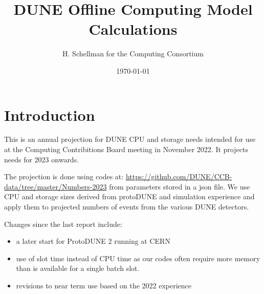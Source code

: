 \documentclass[12pt,landscape]{article}
\title{DUNE Offline Computing Model Calculations}
\author{H. Schellman for the Computing Consortium}
\date{\today}
\begin{document}
\makeatletter
{}
\makeatother
\newcommand{\csvautotabularright}[2][]{\csvloop{autotabularright={#2},#1}}

\maketitle
\section{Introduction}

This is an annual projection for DUNE CPU and storage needs intended for use at the Computing Contribitions Board meeting in November 2022. It projects needs for 2023 onwards. 

The projection is done using codes at: \href{https://github.com/DUNE/CCB-data/tree/master/Numbers-2023}{https://github.com/DUNE/CCB-data/tree/master/Numbers-2023} from parameters stored in a json file. We use CPU and storage sizes derived from protoDUNE and simulation experience and apply them to projected numbers of events from the various DUNE detectors. 

Changes since the last report include:

\begin{itemize}
\item a later start for ProtoDUNE 2 running at CERN
\item use of slot time instead of CPU time as our codes often require more memory than is available for a single batch slot. 
\item revisions to near term use based on the 2022 experience
\end{itemize}
\end{document}
